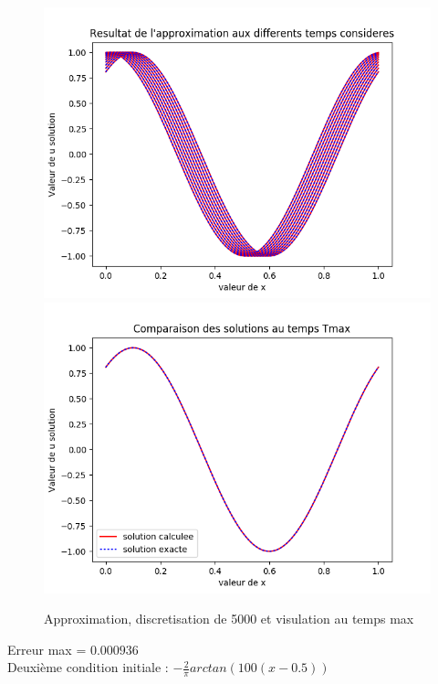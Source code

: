 \documentclass[12pt]{article}
\begin{document}
 \begin{figure}[H]
	\centering
	\includegraphics[scale=0.40]{1D_c1_5000.png}
	\includegraphics[scale=0.40]{Temp_max_c1_5000.png}
	\caption{Approximation, discretisation de 5000 et visulation au temps max}
	\label{1D} 
	\end{figure}
Erreur max = $0.000936$
\\Deuxième condition initiale : $-\frac{2}{\pi}arctan(100(x-0.5))$
\end{document}
